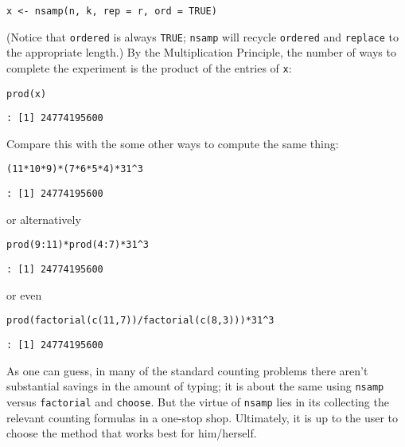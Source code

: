 \begin{verbatim}
x <- nsamp(n, k, rep = r, ord = TRUE) 
\end{verbatim}

(Notice that \texttt{ordered} is always \texttt{TRUE}; \texttt{nsamp} will recycle
\texttt{ordered} and \texttt{replace} to the appropriate length.) By the
Multiplication Principle, the number of ways to complete the
experiment is the product of the entries of \texttt{x}:

\begin{verbatim}
prod(x) 
\end{verbatim}

\begin{verbatim}
: [1] 24774195600
\end{verbatim}

Compare this with the some other ways to compute the same thing: 

\begin{verbatim}
(11*10*9)*(7*6*5*4)*31^3 
\end{verbatim}

\begin{verbatim}
: [1] 24774195600
\end{verbatim}

or alternatively 

\begin{verbatim}
prod(9:11)*prod(4:7)*31^3 
\end{verbatim}

\begin{verbatim}
: [1] 24774195600
\end{verbatim}

or even 

\begin{verbatim}
prod(factorial(c(11,7))/factorial(c(8,3)))*31^3 
\end{verbatim}

\begin{verbatim}
: [1] 24774195600
\end{verbatim}



As one can guess, in many of the standard counting problems there
aren't substantial savings in the amount of typing; it is about the
same using \texttt{nsamp} versus \texttt{factorial} and \texttt{choose}. But the virtue of
\texttt{nsamp} lies in its collecting the relevant counting formulas in a
one-stop shop. Ultimately, it is up to the user to choose the method
that works best for him/herself.


